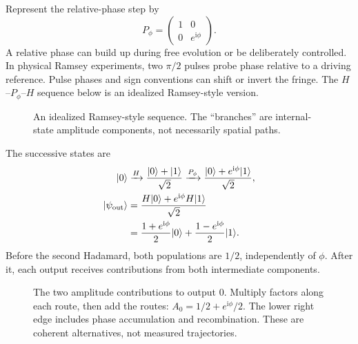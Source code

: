 \documentclass[11pt,a4paper]{article}
\newcommand{\ket}[1]{\lvert #1\rangle}
\newcommand{\ii}{\mathrm{i}}
\begin{document}
Represent the relative-phase step by
\[
P_\phi=\begin{pmatrix}1&0\\0&e^{\ii\phi}\end{pmatrix}.
\]
A relative phase can build up during free evolution or be deliberately controlled. In physical Ramsey experiments, two $\pi/2$ pulses probe phase relative to a driving reference. Pulse phases and sign conventions can shift or invert the fringe. The $H$--$P_\phi$--$H$ sequence below is an idealized Ramsey-style version.

\newpage
\begin{figure}[!ht]
\centering
{}
\caption{An idealized Ramsey-style sequence. The ``branches'' are internal-state amplitude components, not necessarily spatial paths.}
\end{figure}

The successive states are
\begin{align}
\ket{0}&\xrightarrow{H}\frac{\ket{0}+\ket{1}}{\sqrt2}
\xrightarrow{P_\phi}\frac{\ket{0}+e^{\ii\phi}\ket{1}}{\sqrt2},\\
\ket{\psi_{\rm out}}
&=\frac{H\ket{0}+e^{\ii\phi}H\ket{1}}{\sqrt2}\\
&=\frac{1+e^{\ii\phi}}2\ket{0}
+\frac{1-e^{\ii\phi}}2\ket{1}.\label{eq:out}
\end{align}
Before the second Hadamard, both populations are $1/2$, independently of $\phi$. After it, each output receives contributions from both intermediate components.

\begin{figure}[!ht]
\centering
{}
\caption{The two amplitude contributions to output 0. Multiply factors along each route, then add the routes: $A_0=1/2+e^{\ii\phi}/2$. The lower right edge includes phase accumulation and recombination. These are coherent alternatives, not measured trajectories.}\label{fig:paths}
\end{figure}
\end{document}
